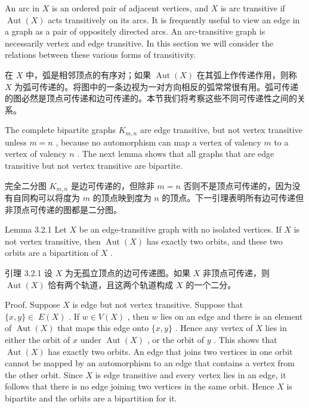 \documentclass[10pt]{article}
\begin{document}
An arc in \(X\) is an ordered pair of adjacent vertices, and \(X\) is arc transitive if \(\operatorname{Aut}\left( X\right)\) acts transitively on its arcs. It is frequently useful to view an edge in a graph as a pair of oppositely directed arcs. An arc-transitive graph is necessarily vertex and edge transitive. In this section we will consider the relations between these various forms of transitivity.

\begin{tcolorbox}\relax
在 \(X\) 中，弧是相邻顶点的有序对；如果 \(\operatorname{Aut}\left( X\right)\) 在其弧上作传递作用，则称 \(X\) 为弧可传递的。将图中的一条边视为一对方向相反的弧常常很有用。弧可传递的图必然是顶点可传递和边可传递的。本节我们将考察这些不同可传递性之间的关系。
\end{tcolorbox}

The complete bipartite graphs \({K}_{m,n}\) are edge transitive, but not vertex transitive unless \(m = n\) , because no automorphism can map a vertex of valency \(m\) to a vertex of valency \(n\) . The next lemma shows that all graphs that are edge transitive but not vertex transitive are bipartite.

\begin{tcolorbox}\relax
完全二分图 \({K}_{m,n}\) 是边可传递的，但除非 \(m = n\) 否则不是顶点可传递的，因为没有自同构可以将度为 \(m\) 的顶点映到度为 \(n\) 的顶点。下一引理表明所有边可传递但非顶点可传递的图都是二分图。
\end{tcolorbox}

Lemma 3.2.1 Let \(X\) be an edge-transitive graph with no isolated vertices. If \(X\) is not vertex transitive, then \(\operatorname{Aut}\left( X\right)\) has exactly two orbits, and these two orbits are a bipartition of \(X\) .

\begin{tcolorbox}\relax
引理 3.2.1 设 \(X\) 为无孤立顶点的边可传递图。如果 \(X\) 非顶点可传递，则 \(\operatorname{Aut}\left( X\right)\) 恰有两个轨道，且这两个轨道构成 \(X\) 的一个二分。
\end{tcolorbox}

Proof. Suppose \(X\) is edge but not vertex transitive. Suppose that \(\{ x,y\}  \in \; E\left( X\right)\) . If \(w \in  V\left( X\right)\) , then \(w\) lies on an edge and there is an element of \(\operatorname{Aut}\left( X\right)\) that maps this edge onto \(\{ x,y\}\) . Hence any vertex of \(X\) lies in either the orbit of \(x\) under \(\operatorname{Aut}\left( X\right)\) , or the orbit of \(y\) . This shows that \(\operatorname{Aut}\left( X\right)\) has exactly two orbits. An edge that joins two vertices in one orbit cannot be mapped by an automorphism to an edge that contains a vertex from the other orbit. Since \(X\) is edge transitive and every vertex lies in an edge, it follows that there is no edge joining two vertices in the same orbit. Hence \(X\) is bipartite and the orbits are a bipartition for it.
\end{document}
